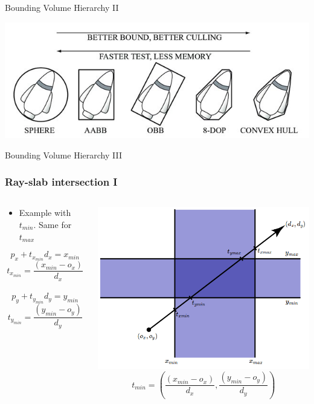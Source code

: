 \documentclass[xcolor=table]{beamer}
\begin{document}
\begin{frame}{Bounding Volume Hierarchy II}

\includegraphics[scale=1.5]{media/volumes.jpg}

\end{frame}

\begin{frame}{Bounding Volume Hierarchy III}
\frametitle{Ray-slab intersection I}

\begin{columns}[T] %

\begin{column}{.48\textwidth}

\begin{itemize}
\item Example with $t_{min}$. Same for $t_{max}$
\end{itemize}

$$
p_x + t_{x_{min}}d_x = x_{min}
$$
$$
t_{x_{min}} = \frac{\left( x_{min} - o_x\right)}{d_x}
$$
\\

$$
p_y + t_{y_{min}}d_y = y_{min}
$$
$$
t_{y_{min}} = \frac{\left( y_{min} - o_y\right)}{d_y}
$$
\end{column}%

\hfill%

\begin{column}{.48\textwidth}
\centering
\includegraphics[scale=0.25]{media/slab_2.png}
$$
t_{min} = \left( \frac{\left( x_{min} - o_x\right)}{d_x}, \frac{\left( y_{min} - o_y\right)}{d_y} \right)
$$
\end{column}%

\end{columns}

\end{frame}
\end{document}

